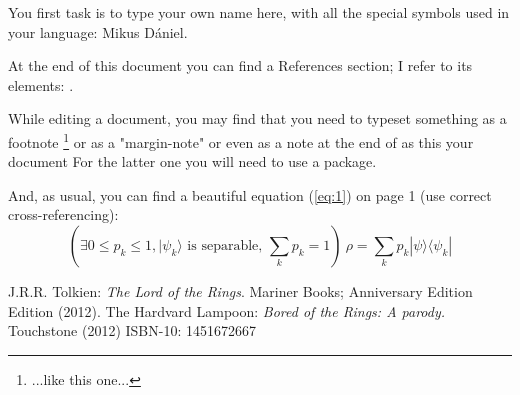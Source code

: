 \documentclass[12pt]{article}
\begin{document}
\par
You first task is to type your own name here, with all the special symbols used in your language: Mikus Dániel. \par
At the end of this document you can find a References section; I refer to its elements: \cite{Lotr, lmp}.  \par
While editing a document, you may find that you need to typeset something as a footnote \footnote{...like this one...} or as a "margin-note"  or even as a note at the end of as this your document  For the latter one you will need to use a package. \par
And, as usual, you can find a beautiful equation (\ref{eq:1}) on page 1 (use correct cross-referencing):
\begin{equation} \label{eq:1}
    \left( \exists 0 \leq p_k \leq 1, | \psi _k \rangle \text{~is separable,~} \sum_k p_k = 1 \right)~ \rho = \sum_k p_k | \psi \rangle \langle \psi _k |
\end{equation}


\begin{thebibliography}{9}
J.R.R. Tolkien: 
\textit{The Lord of the Rings}. Mariner Books; Anniversary Edition
Edition (2012).
The Hardvard Lampoon:
\textit{Bored of the Rings: A parody.} Touchstone 
(2012) ISBN-10: 1451672667
\end{thebibliography}
\theendnotes
\end{document}
